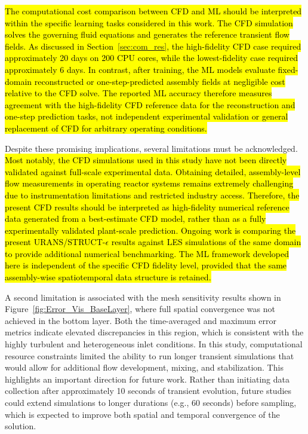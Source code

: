 \documentclass[review]{elsarticle}
\theoremstyle{definition}
\theoremstyle{definition}
\theoremstyle{remark}
\begin{document}
\hl{The computational cost comparison between CFD and ML should be interpreted within the specific learning tasks considered in this work. The CFD simulation solves the governing fluid equations and generates the reference transient flow fields. As discussed in Section~\ref{sec:com_res}, the high-fidelity CFD case required approximately 20 days on 200 CPU cores, while the lowest-fidelity case required approximately 6 days. In contrast, after training, the ML models evaluate fixed-domain reconstructed or one-step-predicted assembly fields at negligible cost relative to the CFD solve. The reported ML accuracy therefore measures agreement with the high-fidelity CFD reference data for the reconstruction and one-step prediction tasks, not independent experimental validation or general replacement of CFD for arbitrary operating conditions.}

Despite these promising implications, several limitations must be acknowledged. \hl{Most notably, the CFD simulations used in this study have not been directly validated against full-scale experimental data. Obtaining detailed, assembly-level flow measurements in operating reactor systems remains extremely challenging due to instrumentation limitations and restricted industry access. Therefore, the present CFD results should be interpreted as high-fidelity numerical reference data generated from a best-estimate CFD model, rather than as a fully experimentally validated plant-scale prediction. Ongoing work is comparing the present URANS/STRUCT-$\epsilon$ results against LES simulations of the same domain to provide additional numerical benchmarking. The ML framework developed here is independent of the specific CFD fidelity level, provided that the same assembly-wise spatiotemporal data structure is retained.}

A second limitation is associated with the mesh sensitivity results shown in Figure~\ref{fig:Error_Vis_BaseLayer}, where full spatial convergence was not achieved in the bottom layer. Both the time-averaged and maximum error metrics indicate elevated discrepancies in this region, which is consistent with the highly turbulent and heterogeneous inlet conditions. In this study, computational resource constraints limited the ability to run longer transient simulations that would allow for additional flow development, mixing, and stabilization. This highlights an important direction for future work. Rather than initiating data collection after approximately 10 seconds of transient evolution, future studies could extend simulations to longer durations (e.g., 60 seconds) before sampling, which is expected to improve both spatial and temporal convergence of the solution.
\end{document}
